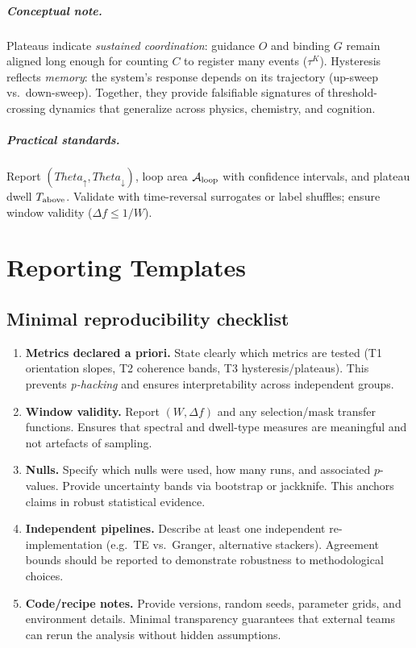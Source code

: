 \documentclass[12pt,a4paper,oneside]{scrreprt}
\def\Theta{Theta}%
\begin{document}
\paragraph{Conceptual note.}
Plateaus indicate \emph{sustained coordination}: guidance $O$ and binding $G$ remain aligned long enough for counting $C$ to register many events ($\tau^K$).  
Hysteresis reflects \emph{memory}: the system’s response depends on its trajectory (up-sweep vs.\ down-sweep).  
Together, they provide falsifiable signatures of threshold-crossing dynamics that generalize across physics, chemistry, and cognition. 

\paragraph{Practical standards.}
Report $(\Theta_\uparrow,\Theta_\downarrow)$, loop area $\mathcal A_{\rm loop}$ with confidence intervals, and plateau dwell $T_{\rm above}$.  
Validate with time-reversal surrogates or label shuffles; ensure window validity ($\Delta f\leq 1/W$).


\chapter{Reporting Templates}\label{app:report}
\section*{Minimal reproducibility checklist}
\begin{enumerate}
\item \textbf{Metrics declared a priori.}  
State clearly which metrics are tested (T1 orientation slopes, T2 coherence bands, T3 hysteresis/plateaus).  
This prevents \emph{p-hacking} and ensures interpretability across independent groups.

\item \textbf{Window validity.}  
Report $(W,\Delta f)$ and any selection/mask transfer functions.  
Ensures that spectral and dwell-type measures are meaningful and not artefacts of sampling.

\item \textbf{Nulls.}  
Specify which nulls were used, how many runs, and associated $p$-values.  
Provide uncertainty bands via bootstrap or jackknife.  
This anchors claims in robust statistical evidence.

\item \textbf{Independent pipelines.}  
Describe at least one independent re-implementation (e.g.\ TE vs.\ Granger, alternative stackers).  
Agreement bounds should be reported to demonstrate robustness to methodological choices.

\item \textbf{Code/recipe notes.}  
Provide versions, random seeds, parameter grids, and environment details.  
Minimal transparency guarantees that external teams can rerun the analysis without hidden assumptions.
\end{enumerate}
\end{document}
